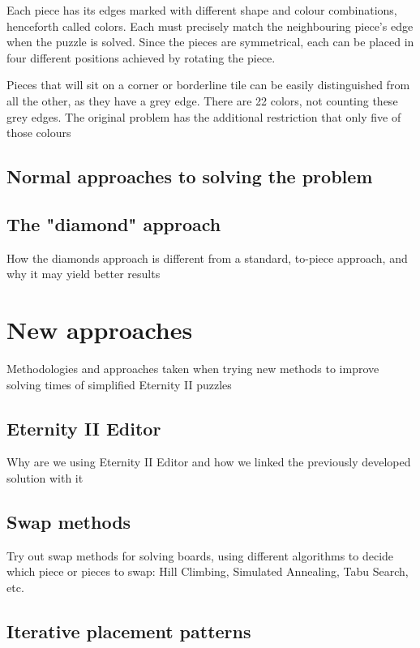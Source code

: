 \documentclass{llncs}
\begin{document}
Each piece has its edges marked with different shape and colour combinations, henceforth called colors. Each must precisely match the neighbouring piece's edge when the puzzle is solved. Since the pieces are symmetrical, each can be placed in four different positions achieved by rotating the piece.

Pieces that will sit on a corner or borderline tile can be easily distinguished from all the other, as they have a grey edge. There are 22 colors, not counting these grey edges. The original problem has the additional restriction that only five of those colours 


\subsection{Normal approaches to solving the problem}


\subsection{The "diamond" approach}

How the diamonds approach is different from a standard, to-piece approach, and why it may yield better results


\section{New approaches}

Methodologies and approaches taken when trying new methods to improve solving times of simplified Eternity II puzzles

\subsection{Eternity II Editor}

Why are we using Eternity II Editor and how we linked the previously developed solution with it

\subsection{Swap methods}

Try out swap methods for solving boards, using different algorithms to decide which piece or pieces to swap: Hill Climbing, Simulated Annealing, Tabu Search, etc.

\subsection{Iterative placement patterns}
\end{document}
